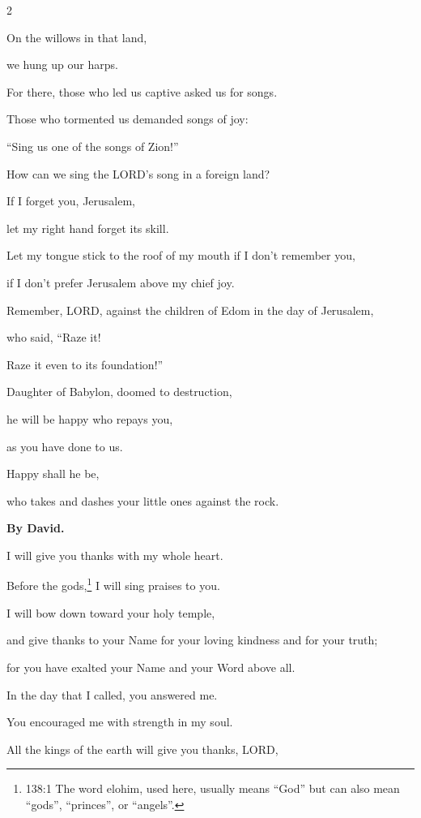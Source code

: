 \begin{multicols}{2}
	
	\myverse{}On the willows in that land,
	
	we hung up our harps.
	
	
	\myverse{}For there, those who led us captive asked us for songs.
	
	Those who tormented us demanded songs of joy:
	
	“Sing us one of the songs of Zion!”
	
	
	\myverse{}How can we sing the LORD’s song in a foreign land?
	
	
	\myverse{}If I forget you, Jerusalem,
	
	let my right hand forget its skill.
	
	
	\myverse{}Let my tongue stick to the roof of my mouth if I don’t remember
	you,
	
	if I don’t prefer Jerusalem above my chief joy.
	
	
	\myverse{}Remember, LORD, against the children of Edom in the day of Jerusalem,
	
	who said, “Raze it!
	
	Raze it even to its foundation!”
	
	
	\myverse{}Daughter of Babylon, doomed to destruction,
	
	he will be happy who repays you,
	
	as you have done to us.
	
	
	\myverse{}Happy shall he be,
	
	who takes and dashes your little ones against the rock.
	
	
	\mychapter{}\textbf{By David.}
	
		\quad\quad\quad \myverse*{}I will give you thanks with my whole heart.
	
 Before the gods,\footnote{138:1 The word elohim, used here, usually means “God” but can also mean “gods”, “princes”, or “angels”.}
	I will sing praises to you.
	
	
	\myverse{}I will bow down toward your holy temple,
	
	and give thanks to your Name for your loving kindness and for your truth;
	
	for you have exalted your Name and your Word above all.
	
	
	\myverse{}In the day that I called, you answered me.
	
	You encouraged me with strength in my soul.
	
	
	\myverse{}All the kings of the earth will give you thanks, LORD,
	

\end{multicols}
